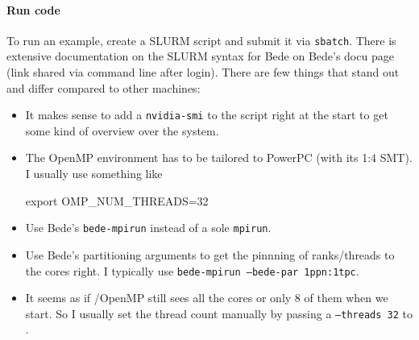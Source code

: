 % 
% 



\paragraph{Run code}

To run an example, create a SLURM script and submit it via \texttt{sbatch}.
There is extensive documentation on the SLURM syntax for Bede on Bede's docu
page (link shared via command line after login).
There are few things that stand out and differ compared to other machines:

\begin{itemize}
  \item It makes sense to add a \texttt{nvidia-smi} to the script right at the
  start to get some kind of overview over the system.
  \item The OpenMP environment has to be tailored to PowerPC (with its 1:4 SMT).
  I usually use something like
  \begin{code}
export OMP_NUM_THREADS=32  
  \end{code}
  \item Use Bede's \texttt{bede-mpirun} instead of a sole \texttt{mpirun}.
  \item Use Bede's partitioning arguments to get the pinnning of ranks/threads
  to the cores right. I typically use \texttt{bede-mpirun --bede-par 1ppn:1tpc}.
  \item It seems as if \Peano/OpenMP still sees all the cores or only 8 of them
  when we start. So I usually set the thread count manually by passing a
  \texttt{--threads 32} to \Peano.
\end{itemize}



